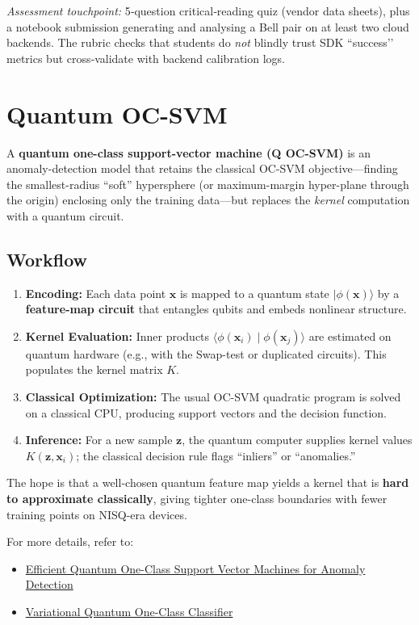 \documentclass[11pt,a4paper]{article}
\begin{document}
\vspace{0.5em}
\noindent\emph{Assessment touchpoint:} 5‑question critical‑reading quiz (vendor data sheets), plus a notebook submission generating and analysing a Bell pair on at least two cloud backends.  The rubric checks that students do \emph{not} blindly trust SDK ``success’’ metrics but cross‑validate with backend calibration logs.

\section{Quantum OC-SVM}

	A \textbf{quantum one-class support-vector machine (Q OC-SVM)} is an anomaly-detection model that retains the classical OC-SVM objective—finding the smallest-radius “soft” hypersphere (or maximum-margin hyper-plane through the origin) enclosing only the training data—but replaces the \emph{kernel} computation with a quantum circuit.
	
	\subsection{Workflow}
	\begin{enumerate}
		\item \textbf{Encoding:} Each data point $\mathbf{x}$ is mapped to a quantum state $\lvert \phi(\mathbf{x})\rangle$ by a \textbf{feature-map circuit} that entangles qubits and embeds nonlinear structure.
		\item \textbf{Kernel Evaluation:} Inner products $\langle \phi(\mathbf{x}_i) \mid \phi(\mathbf{x}_j) \rangle$ are estimated on quantum hardware (e.g., with the Swap-test or duplicated circuits). This populates the kernel matrix $K$.
		\item \textbf{Classical Optimization:} The usual OC-SVM quadratic program is solved on a classical CPU, producing support vectors and the decision function.
		\item \textbf{Inference:} For a new sample $\mathbf{z}$, the quantum computer supplies kernel values $K(\mathbf{z}, \mathbf{x}_i)$; the classical decision rule flags “inliers” or “anomalies.”
	\end{enumerate}
	
	The hope is that a well-chosen quantum feature map yields a kernel that is \textbf{hard to approximate classically}, giving tighter one-class boundaries with fewer training points on NISQ-era devices.
	
	For more details, refer to:
	\begin{itemize}
		\item \href{https://arxiv.org/abs/2407.20753}{Efficient Quantum One-Class Support Vector Machines for Anomaly Detection}
		\item \href{https://arxiv.org/abs/2210.02674}{Variational Quantum One-Class Classifier}
	\end{itemize}
	
\end{document}
